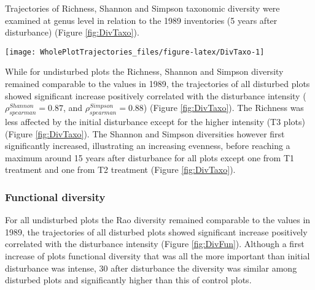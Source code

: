 \documentclass[fleqn,10pt]{ArtEcoFoG} %
\theoremstyle{definition}
\theoremstyle{definition}
\theoremstyle{definition}
\theoremstyle{remark}
\begin{document}
Trajectories of Richness, Shannon and Simpson taxonomic diversity were
examined at genus level in relation to the 1989 inventories (5 years
after disturbance) (Figure \ref{fig:DivTaxo}).

\begin{figure*}

{\centering \texttt{[image: WholePlotTrajectories\_files/figure-latex/DivTaxo-1]} 

}

\caption{Trajectories of the difference to the 1989 inventories (5 years after disturbance) over 30 years after disturbance of plots communities \textbf{(a)} Richness, \textbf{(b)} Shannon and \textbf{(c)} Simpson diversities. Trajectories correspond to the median (solid line) and 0.025 and 0.975 percentile (gray envelope) observed after 50 iteration of the taxonomic uncertainty propagation. Initial treatments are represented by solid lines colors with green for control, blue for T1,orange for T2 and red for T3.}\label{fig:DivTaxo}
\end{figure*}

While for undisturbed plots the Richness, Shannon and Simpson diversity
remained comparable to the values in 1989, the trajectories of all
disturbed plots showed significant increase positively correlated with
the disturbance intensity (\(\rho_{spearman}^{Shannon}=0.87\), and
\(\rho_{spearman}^{Simpson}=0.88\)) (Figure \ref{fig:DivTaxo}). The
Richness was less affected by the initial disturbance except for the
higher intensity (T3 plots) (Figure \ref{fig:DivTaxo}). The Shannon and
Simpson diversities however first significantly increased, illustrating
an increasing evenness, before reaching a maximum around 15 years after
disturbance for all plots except one from T1 treatment and one from T2
treatment (Figure \ref{fig:DivTaxo}).

\subsubsection{Functional diversity}\label{functional-diversity}

For all undisturbed plots the Rao diversity remained comparable to the
values in 1989, the trajectories of all disturbed plots showed
significant increase positively correlated with the disturbance
intensity (Figure \ref{fig:DivFun}). Although a first increase of plots
functional diversity that was all the more important than initial
disturbance was intense, 30 after disturbance the diversity was similar
among disturbed plots and significantly higher than this of control
plots.
\end{document}
